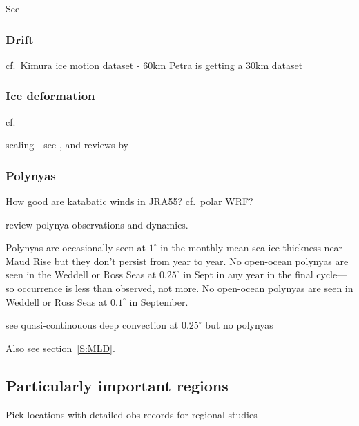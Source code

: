 \documentclass[11pt, a4paper]{article}
\begin{document}
See \citet{PellicheroSalleeChapmanDownes2018a}

\subsubsection{Drift}
cf.\ Kimura ice motion dataset - 60km
Petra is getting a 30km dataset

\citet{GilesMassomHeilHyland2011a}
\citet{SumataETAL2014a, SumataKwokGerdesKaukerKarcher2015a, SumataGerdesKaukerKarcher2015a, SzanyiLukovichBarberHaller2016a}
\citet{KwokPangKacimi2017a} %

\subsubsection{Ice deformation}
cf. \citet{HutchingsRobertsGeigerRichter-Menge2011a}

scaling - see \citet{HutterLoschMenemenlis2018a}, \citet{GirardWeissMolinesBarnierBouillon2009a} and reviews by \citet{Weiss2003a, Weiss2017a, WeissDansereau2017a}

\subsubsection{Polynyas}\label{S:polynyas}
How good are katabatic winds in JRA55? cf.\ polar WRF?

\citet{Morales-Maqueda2004a} review polynya observations and dynamics.

\citet{UotilaOFarrellMarslandBi2013a}
\citet{KwokHunkeMaslowskiMenemenlisZhang2008a}

Polynyas are occasionally seen at $1^\circ$ in the monthly mean sea ice thickness near Maud Rise but they don't persist from year to year.
No open-ocean polynyas are seen in the Weddell or Ross Seas at $0.25^\circ$ in Sept in any year in the final cycle---so occurrence is less than observed, not more.
No open-ocean polynyas are seen in Weddell or Ross Seas at $0.1^\circ$ in September.

\citet{DufourMorrisonGriffiesFrengerZanowskiWinton2017a} see quasi-continouous deep convection at $0.25^\circ$ but no polynyas

Also see section~\ref{S:MLD}.

\FloatBarrier

\subsection{Particularly important regions}
Pick locations with detailed obs records for regional studies
\end{document}
